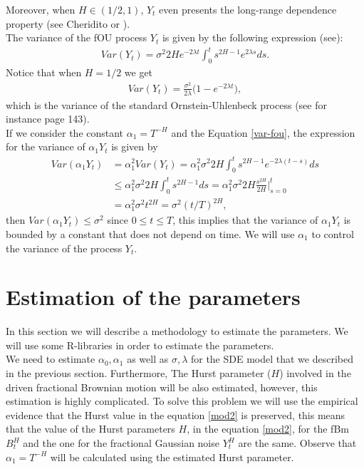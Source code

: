 \documentclass[smallextended]{svjour3}
\begin{document}
Moreover, when $H \in(1/2,1)$, $Y_t$ even presents the long-range dependence
property (see Cheridito
\cite{ch-ka-ma} or  \cite{ra}).\\

The variance of the fOU process $Y_t$ is given by the following expression
(see\cite{ze-ch-ya}):
\begin{align}
Var(Y_t)= \sigma^2 2H e^{-2\lambda t} \int_0^t s^{2H-1} e^{2\lambda s}
ds.\label{var-fou}
\end{align}
Notice that when $H=1/2$ we get
\begin{align}
Var(Y_t)= \frac{\sigma^2}{2\lambda}  \big(1-e^{-2\lambda t}\big),
\end{align}
which is the variance of the standard Ornstein-Uhlenbeck process (see for
instance \cite{mik} page 143). \\

If we consider the constant $\alpha_1 = T^{-H}$ and the Equation
\eqref{var-fou},
the expression for the variance of $\alpha_1 Y_t$ is given by
\begin{align}
Var(\alpha_1 Y_t)&= \alpha_1^2 Var(Y_t)= \alpha_1^2\sigma^2 2H  \int_0^t
s^{2H-1} e^{-2\lambda (t-s)} ds\nonumber
\\
&\le \alpha_1^2 \sigma^2 2H  \int_0^t s^{2H-1} ds= \alpha_1^2 \sigma^2 2H
\frac{s^{2H}}{2H}\Big|_{s=0}^t \nonumber
\\
&= \alpha_1^2 \sigma^2 t^{2H} = \sigma^2 (t/T)^{2H},\label{var-fou1}
\end{align}
then $Var(\alpha_1 Y_t)\le \sigma^2 $ since $0\le t\le T$, this implies that
the variance of $\alpha_1 Y_t$
is bounded by a constant that does not depend on time. We will use $\alpha_1$
to control the variance of the process $Y_t$.



\section{Estimation of the parameters}
\label{esti}

In this section we will describe a methodology to estimate the parameters.
We will use some R-libraries in order to estimate the parameters. \\

We need to estimate $\alpha_0, \alpha_1$ as well as $\sigma,\lambda$ for the
SDE model that we described in the previous section. Furthermore,
The Hurst parameter ($H$) involved in the driven fractional Brownian motion
will be also estimated, however, this estimation is highly complicated.
To solve this problem we will use the empirical evidence that the Hurst value
in the equation \eqref{mod2}
is preserved, this means that the  value of the  Hurst parameters $H$, in the
equation \eqref{mod2}, for the fBm $B_t^H$ and the one for the
fractional Gaussian noise $Y_t^H$ are the same. Observe that $\alpha_1=T^{-H}$
will be calculated using the estimated Hurst parameter.
\end{document}
